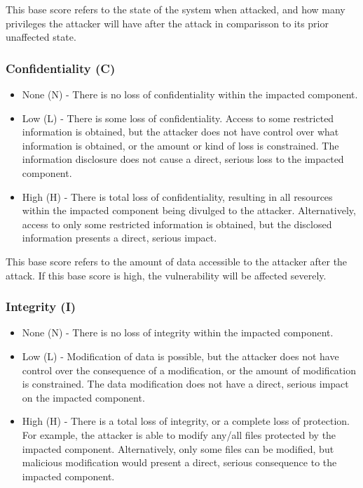 This base score refers to the state of the system when attacked, and how many privileges the attacker will have after the attack in comparisson to its prior  unaffected state.

\subsubsection{Confidentiality (C)}

\begin{itemize}
	\item None (N) - There is no loss of confidentiality within the impacted component.
	\item Low (L) - There is some loss of confidentiality. Access to some restricted information is obtained, but the attacker does not have control over what information is obtained, or the amount or kind of loss is constrained. The information disclosure does not cause a direct, serious loss to the impacted component. 
	\item High (H) - There is total loss of confidentiality, resulting in all resources within the impacted component being divulged to the attacker. Alternatively, access to only some restricted information is obtained, but the disclosed information presents a direct, serious impact.
\end{itemize}

This base score refers to the amount of data accessible to the attacker after the attack. If this base score is high, the vulnerability will be affected severely.

\subsubsection{Integrity (I)}

\begin{itemize}
	\item None (N) - There is no loss of integrity within the impacted component.
	\item Low (L) - Modification of data is possible, but the attacker does not have control over the consequence of a modification, or the amount of modification is constrained. The data modification does not have a direct, serious impact on the impacted component.
	\item High (H) - There is a total loss of integrity, or a complete loss of protection. For example, the attacker is able to modify any/all files protected by the impacted component. Alternatively, only some files can be modified, but malicious modification would present a direct, serious consequence to the impacted component.
\end{itemize}

